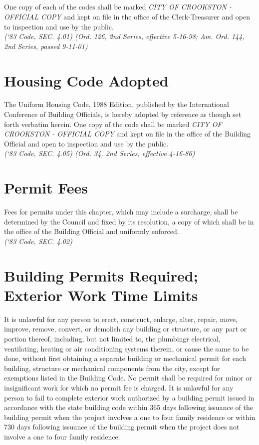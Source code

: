 \subsection{}
One copy of each of the codes shall be marked \emph{CITY OF CROOKSTON - OFFICIAL COPY} and kept on file in the office of the Clerk-Treasurer and open to inspection and use by the public.\\
\emph{(‘83 Code, SEC. 4.01)  (Ord. 126, 2nd Series, effective 5-16-98; Am. Ord. 144, 2nd Series, passed 9-11-01)}
\section{Housing Code Adopted}
The Uniform Housing Code, 1988 Edition, published by the International Conference of Building Officials, is hereby adopted by reference as though set forth verbatim herein.  One copy of the code shall be marked \emph{CITY OF CROOKSTON - OFFICIAL COPY} and kept on file in the office of the Building Official and open to inspection and use by the public.\\
\emph{(‘83 Code, SEC. 4.05)  (Ord. 34, 2nd Series, effective 4-16-86)}
\section{Permit Fees}
Fees for permits under this chapter, which may include a surcharge, shall be determined by the Council and fixed by its resolution, a copy of which shall be in the office of the Building Official and uniformly enforced.\\
\emph{(‘83 Code, SEC. 4.02)}
\section{Building Permits Required; Exterior Work Time Limits}
It is unlawful for any person to erect, construct, enlarge, alter, repair, move, improve, remove, convert, or demolish any building or structure, or any part or portion thereof, including, but not limited to, the plumbingr electrical, ventilating, heating or air conditioning systems therein, or cause the same to be done, without first obtaining a separate building or mechanical permit for each building, structure or mechanical components from the city, except for exemptions listed in the Building Code. No permit shall be required for minor or insignificant work for which no permit fee is charged. It is unlawful for any person to fail to complete exterior work authorized by a building permit issued in accordance with the state building code within 365 days following issuance of the building permit when the project involves a one to four family residence or within 730 days following issuance of the building permit when the project does not involve a one to four family residence.
